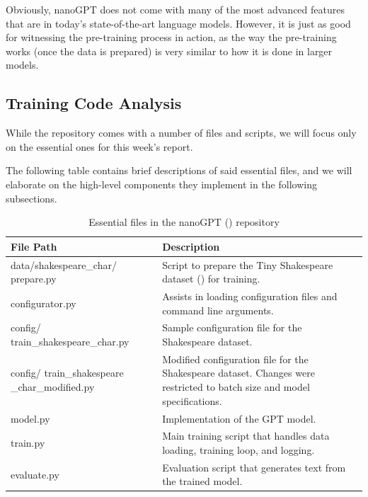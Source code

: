 \documentclass{article} %
\theoremstyle{definition}
\begin{document}
Obviously, nanoGPT does not come with many of the most advanced features
that are in today's state-of-the-art language models. However,
it is just as good for witnessing the pre-training process in action,
as the way the pre-training works (once the data is prepared) is very similar
to how it is done in larger models.

\subsection{Training Code Analysis}
While the repository comes with a number of files and scripts,
we will focus only on the essential ones for this week's report.

The following table contains brief descriptions of said essential files,
and we will elaborate on the high-level components they implement 
in the following subsections.

\begin{table}
    \centering
    \begin{tabular}{|p{}|p{}|}
        \hline
        \textbf{File Path} & \textbf{Description} \\
        \hline
        data/shakespeare\_char/ \newline prepare.py 
        & Script to prepare the Tiny Shakespeare dataset (\cite{tinyss}) for training.
        \\ \hline
        configurator.py & 
        Assists in loading configuration files and command line arguments.
        \\ \hline
        config/ \newline train\_shakespeare\_char.py 
        & Sample configuration file for the Shakespeare dataset.
        \\ \hline
        config/ \newline train\_shakespeare \newline \_char\_modified.py 
        & Modified configuration file for the Shakespeare dataset. \newline
        Changes were restricted to batch size and model specifications.
        \\ \hline
        model.py & Implementation of the GPT model.
        \\ \hline
        train.py & Main training script that handles data loading, training loop, and logging.
        \\ \hline
        evaluate.py & Evaluation script that generates text from the trained model.
        \\ \hline
    \end{tabular}
    \caption{Essential files in the nanoGPT (\cite{nanoGPT}) repository}
    \label{tab:nanogpt_files}
\end{table}
\end{document}
